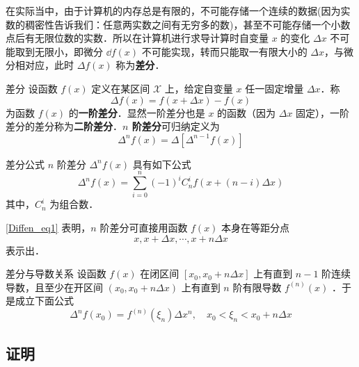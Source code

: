 在实际当中，由于计算机的内存总是有限的，不可能存储一个连续的数据(因为实数的稠密性告诉我们：任意两实数之间有无穷多的数)，甚至不可能存储一个小数点后有无限位数的实数．所以在计算机进行求导计算时自变量 $x$ 的变化 $\Delta x$ 不可能取到无限小，即微分 $\dd f({x})$ 不可能实现，转而只能取一有限大小的 $\Delta x$，与微分相对应，此时 $\Delta f(x)$ 称为\textbf{差分}．
\begin{definition}{差分}
设函数 $f(x)$ 定义在某区间 $\mathcal{X}$ 上，给定自变量 $x$ 任一固定增量 $\Delta x$．称
\begin{equation}
\Delta f(x)=f(x+\Delta x)-f(x)
\end{equation}
为函数 $f(x)$ 的\textbf{一阶差分}．显然一阶差分也是 $x$ 的函数（因为 $\Delta x$ 固定），一阶差分的差分称为\textbf{二阶差分}．\textbf{$n$ 阶差分}可归纳定义为
\begin{equation}
\Delta^n f(x)=\Delta[\Delta^{n-1}f(x)]
\end{equation}
\end{definition}
\begin{theorem}{差分公式}\label{Diffen_the1}
$n$ 阶差分 $\Delta^n f(x)$ 具有如下公式
\begin{equation}\label{Diffen_eq1}
\Delta^nf(x)=\sum_{i=0}^n(-1)^iC_n^if(x+(n-i)\Delta x)
\end{equation}
其中，$C_n^i$ 为组合数．
\end{theorem}
\autoref{Diffen_eq1} 表明，$n$ 阶差分可直接用函数 $f(x)$ 本身在等距分点
\begin{equation}
x,x+\Delta x,\cdots,x+n\Delta x
\end{equation}
表示出．
\begin{theorem}{差分与导数关系}\label{Diffen_the2}
设函数 $f(x)$ 在闭区间 $[x_0,x_0+n\Delta x]$ 上有直到 $n-1$ 阶连续导数，且至少在开区间 $(x_0,x_0+n\Delta x)$ 上有直到 $n$ 阶有限导数 $f^{(n)}(x)$ ．于是成立下面公式
\begin{equation}
\Delta^nf(x_0)=f^{(n)}(\xi_n)\Delta x^n ,\quad x_0<\xi_n<x_0+n\Delta x
\end{equation}
\end{theorem}
\subsection{证明}
